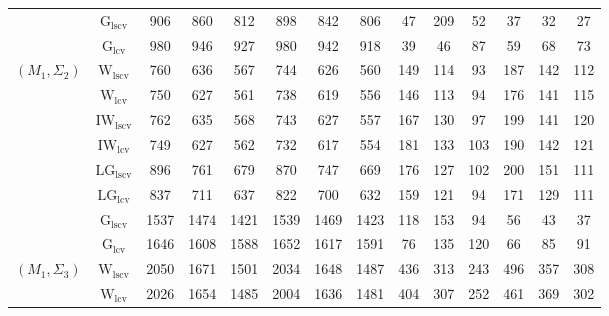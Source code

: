\begin{table}[!ht]
{\begin{tabular}{@{}cc|ccc|ccc|ccc|ccc@{}}
 & $\mathrm{G}_{\mathrm{lscv}}$ & 906 & 860 & 812 & 898 & 842 & 806 & \cellcolor{black!10}47 & 209 & \cellcolor{black!30}52 & \cellcolor{black!30}37 & \cellcolor{black!30}32 & \cellcolor{black!30}27 \\ 
 & $\mathrm{G}_{\mathrm{lcv}}$ & 980 & 946 & 927 & 980 & 942 & 918 & \cellcolor{black!30}39 & \cellcolor{black!30}46 & 87 & \cellcolor{black!10}59 & \cellcolor{black!10}68 & 73 \\ 
\midrule
$(M_1,\Sigma_2)$ & $\mathrm{W}_{\mathrm{lscv}}$ & 760 & 636 & 567 & 744 & 626 & 560 & 149 & \cellcolor{black!10}114 & \cellcolor{black!30}93 & 187 & 142 & 112 \\ 
 & $\mathrm{W}_{\mathrm{lcv}}$ & \cellcolor{black!10}750 & \cellcolor{black!10}627 & \cellcolor{black!30}561 & \cellcolor{black!10}738 & \cellcolor{black!10}619 & \cellcolor{black!10}556 & 146 & \cellcolor{black!30}113 & \cellcolor{black!10}94 & 176 & 141 & 115 \\ 
 & $\mathrm{IW}_{\mathrm{lscv}}$ & 762 & 635 & 568 & 743 & 627 & 557 & 167 & 130 & 97 & 199 & 141 & 120 \\ 
 & $\mathrm{IW}_{\mathrm{lcv}}$ & \cellcolor{black!30}749 & \cellcolor{black!30}627 & \cellcolor{black!10}562 & \cellcolor{black!30}732 & \cellcolor{black!30}617 & \cellcolor{black!30}554 & 181 & 133 & 103 & 190 & 142 & 121 \\ 
 & $\mathrm{LG}_{\mathrm{lscv}}$ & 896 & 761 & 679 & 870 & 747 & 669 & 176 & 127 & 102 & 200 & 151 & 111 \\ 
 & $\mathrm{LG}_{\mathrm{lcv}}$ & 837 & 711 & 637 & 822 & 700 & 632 & 159 & 121 & 94 & 171 & 129 & 111 \\ 
 & $\mathrm{G}_{\mathrm{lscv}}$ & 1537 & 1474 & 1421 & 1539 & 1469 & 1423 & \cellcolor{black!10}118 & 153 & 94 & \cellcolor{black!30}56 & \cellcolor{black!30}43 & \cellcolor{black!30}37 \\ 
 & $\mathrm{G}_{\mathrm{lcv}}$ & 1646 & 1608 & 1588 & 1652 & 1617 & 1591 & \cellcolor{black!30}76 & 135 & 120 & \cellcolor{black!10}66 & \cellcolor{black!10}85 & \cellcolor{black!10}91 \\ 
\midrule
$(M_1,\Sigma_3)$ & $\mathrm{W}_{\mathrm{lscv}}$ & 2050 & 1671 & 1501 & 2034 & 1648 & 1487 & 436 & 313 & 243 & 496 & 357 & 308 \\ 
 & $\mathrm{W}_{\mathrm{lcv}}$ & \cellcolor{black!10}2026 & \cellcolor{black!10}1654 & \cellcolor{black!10}1485 & \cellcolor{black!10}2004 & \cellcolor{black!10}1636 & 1481 & 404 & \cellcolor{black!10}307 & 252 & 461 & 369 & 302 \\ 

\end{tabular}}
\end{table}
